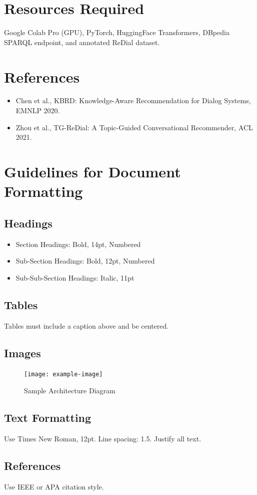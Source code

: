 \documentclass[12pt]{article}
\begin{document}
\section{Resources Required}
Google Colab Pro (GPU), PyTorch, HuggingFace Transformers, DBpedia SPARQL endpoint, and annotated ReDial dataset.

\section{References}
\begin{itemize}
    \item Chen et al., KBRD: Knowledge-Aware Recommendation for Dialog Systems, EMNLP 2020.
    \item Zhou et al., TG-ReDial: A Topic-Guided Conversational Recommender, ACL 2021.
\end{itemize}

\newpage
\section{Guidelines for Document Formatting}
\subsection{Headings}
\begin{itemize}
    \item Section Headings: Bold, 14pt, Numbered
    \item Sub-Section Headings: Bold, 12pt, Numbered
    \item Sub-Sub-Section Headings: Italic, 11pt
\end{itemize}

\subsection{Tables}
Tables must include a caption above and be centered.

\subsection{Images}
\begin{figure}[h!]
    \centering
    \texttt{[image: example-image]}
    \caption{Sample Architecture Diagram}
\end{figure}

\subsection{Text Formatting}
Use Times New Roman, 12pt. Line spacing: 1.5. Justify all text.

\subsection{References}
Use IEEE or APA citation style.
\end{document}
